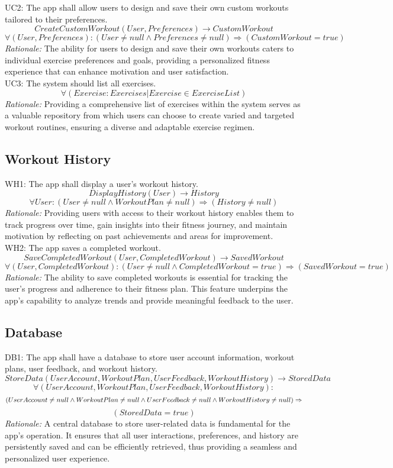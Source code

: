 \documentclass[12pt]{article}
\begin{document}
UC2: The app shall allow users to design and save their own custom workouts tailored to their preferences.
\[CreateCustomWorkout(User, Preferences) \rightarrow CustomWorkout \]
\[ \forall (User, Preferences):(User \neq null \land Preferences \neq null) \Rightarrow (CustomWorkout = true) \]
\textit{Rationale:} The ability for users to design and save their own workouts caters to individual exercise preferences and goals, providing a personalized fitness experience that can enhance motivation and user satisfaction.
\\

UC3: The system should list all exercises.
\[ \forall  (Exercise:Exercises | Exercise \in ExerciseList) \]
\textit{Rationale:} Providing a comprehensive list of exercises within the system serves as a valuable repository from which users can choose to create varied and targeted workout routines, ensuring a diverse and adaptable exercise regimen.

\subsection{Workout History}
WH1: The app shall display a user’s workout history.
\[DisplayHistory(User) \rightarrow History \]
\[ \forall User: (User \neq null \wedge WorkoutPlan \neq null) \Rightarrow (History \neq null) \]
\textit{Rationale:} Providing users with access to their workout history enables them to track progress over time, gain insights into their fitness journey, and maintain motivation by reflecting on past achievements and areas for improvement.
\\

WH2: The app saves a completed workout.
\[SaveCompletedWorkout(User, CompletedWorkout) \rightarrow SavedWorkout \]
\[ \forall (User, CompletedWorkout): (User \neq null \land CompletedWorkout = true) \Rightarrow (SavedWorkout = true) \]
\textit{Rationale:} The ability to save completed workouts is essential for tracking the user’s progress and adherence to their fitness plan. This feature underpins the app's capability to analyze trends and provide meaningful feedback to the user.

\subsection{Database}
DB1: The app shall have a database to store user account information, workout plans, user feedback, and workout history.
\[StoreData(UserAccount, WorkoutPlan, UserFeedback, WorkoutHistory) \rightarrow StoredData \]
\[ \forall (UserAccount, WorkoutPlan, UserFeedback, WorkoutHistory):\] 
\[(UserAccount \neq null \land WorkoutPlan \neq null \land UserFeedback \neq null \land WorkoutHistory \neq null) \\
\Rightarrow\] \[(StoredData = true) \]
\textit{Rationale:} A central database to store user-related data is fundamental for the app's operation. It ensures that all user interactions, preferences, and history are persistently saved and can be efficiently retrieved, thus providing a seamless and personalized user experience.
\end{document}
